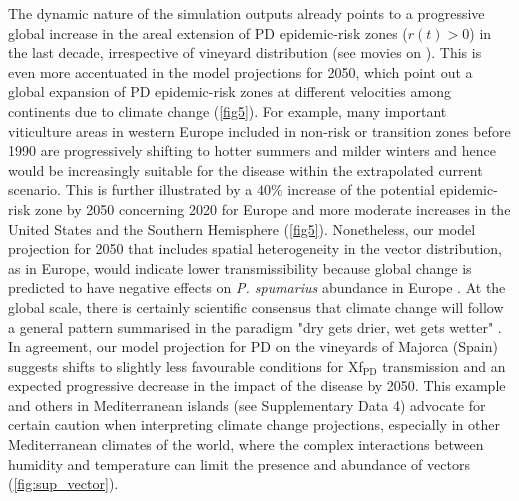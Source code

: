     The dynamic nature of the simulation outputs already points to a
    progressive
    global increase in the areal extension of PD epidemic-risk zones ($r(t)>0$)
    in
    the last decade, irrespective of vineyard distribution (see movies on
    \cite{Webpage}). This is even more accentuated in the model projections for
    2050, which point out a global expansion of PD epidemic-risk zones at
    different
    velocities among continents due to climate change (\cref{fig5}). For
    example,
    many important viticulture areas in western Europe included in non-risk or
    transition zones before 1990 are progressively shifting to hotter summers
    and
    milder winters and hence would be increasingly suitable for the disease
    within
    the extrapolated current scenario. This is further illustrated by a $40\%$
    increase of the potential epidemic-risk zone by 2050 concerning 2020 for
    Europe
    and more moderate increases in the United States and the Southern
    Hemisphere
    (\cref{fig5}). Nonetheless, our model projection for 2050 that includes
    spatial
    heterogeneity in the vector distribution, as in Europe, would indicate
    lower
    transmissibility because global change is predicted to have negative
    effects on
    \textit{P. spumarius} abundance in Europe \cite{Godefroid2021,Karban2018}.
    At
    the global scale, there is certainly scientific consensus that climate
    change
    will follow a general pattern summarised in the paradigm "dry gets drier,
    wet
    gets wetter" \cite{Feng2015}. In agreement, our model projection for PD on
    the
    vineyards of Majorca (Spain) suggests shifts to slightly less favourable
    conditions for Xf$_{\textrm{PD}}$ transmission and an expected progressive
    decrease in the impact of the disease by 2050. This example and others in
    Mediterranean islands (see Supplementary Data 4) advocate for certain
    caution
    when interpreting climate change projections, especially in other
    Mediterranean
    climates of the world, where the complex interactions between humidity and
    temperature can limit the presence and abundance of vectors
    (\cref{fig:sup_vector}).

